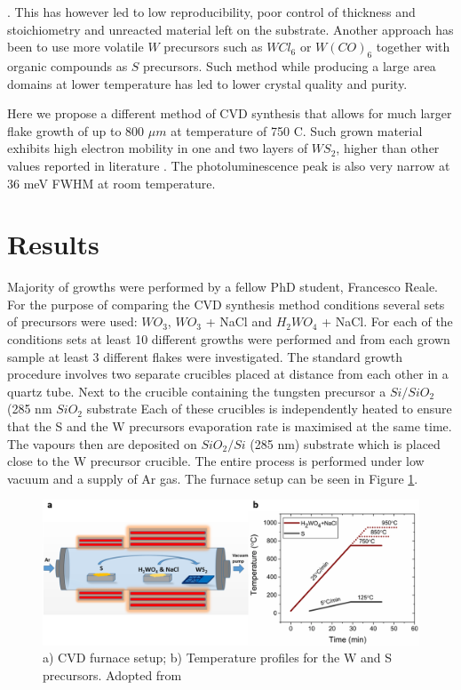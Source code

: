 \cite{doi:10.1021/nn4046002}\cite{Li2015}\cite{Gao2015}\cite{Cong2013}\cite{Yun2015}\cite{Gong2015}\cite{Gong2014}. This has however led to low reproducibility, poor control of thickness and stoichiometry and unreacted material left on the substrate. Another approach has been to use more volatile $W$ precursors such as $WCl_6$\cite{Carmalt2003} or $W(CO)_6$\cite{Kang2015}\cite{Eichfeld2015} together with organic compounds as $S$ precursors. Such method while producing a large area domains at lower temperature has led to lower crystal quality and purity.

Here we propose a different method of CVD synthesis that allows for much larger flake growth of up to 800 $\mu m$ at temperature of 750 {\degree}C. Such grown material exhibits high electron mobility in one and two layers of $WS_2$, higher than other values reported in literature \cite{Yun2015}\cite{Iqbal2015a}. The photoluminescence peak is also very narrow at 36 meV FWHM at room temperature. 

\section{Results}

Majority of growths were performed by a fellow PhD student, Francesco Reale. For the purpose of comparing the CVD synthesis method conditions several sets of precursors were used: $WO_3$, $WO_3$ + NaCl and $H_2WO_4$ + NaCl. For each of the conditions sets at least 10 different growths were performed and from each grown sample at least 3 different flakes were investigated. The standard growth procedure involves two separate crucibles placed at distance from each other in a quartz tube. Next to the crucible containing the tungsten precursor a $Si/SiO_2$ (285 nm $SiO_2$ substrate  Each of these crucibles is independently heated to ensure that the S and the W precursors evaporation rate is maximised at the same time. The vapours then are deposited on $SiO_2/Si$ (285 nm) substrate which is placed close to the W precursor crucible. The entire process is performed under low vacuum and a supply of Ar gas. The furnace setup can be seen in Figure \ref{fig:PaperSIFurnace}.

\begin{figure}[h]
	\begin{center}
		\includegraphics[scale=0.3]{PaperSIFurnace.png}
		\caption{a) CVD furnace setup; b) Temperature profiles for the W and S precursors. Adopted from \cite{Reale2017}}
		\label{fig:PaperSIFurnace}
	\end{center}
\end{figure} 

